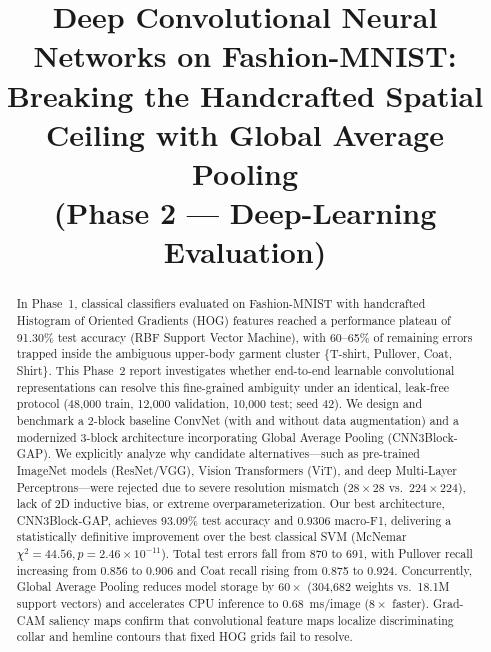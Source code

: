\documentclass[conference]{IEEEtran}
\begin{document}
\title{Deep Convolutional Neural Networks on Fashion-MNIST:\\ Breaking the Handcrafted Spatial Ceiling with Global Average Pooling\\ (Phase 2 --- Deep-Learning Evaluation)}

\author{
}

\maketitle

\begin{abstract}
In Phase~1, classical classifiers evaluated on Fashion-MNIST with handcrafted Histogram of Oriented Gradients (HOG) features reached a performance plateau of 91.30\% test accuracy (RBF Support Vector Machine), with 60--65\% of remaining errors trapped inside the ambiguous upper-body garment cluster \{T-shirt, Pullover, Coat, Shirt\}. This Phase~2 report investigates whether end-to-end learnable convolutional representations can resolve this fine-grained ambiguity under an identical, leak-free protocol (48{,}000 train, 12{,}000 validation, 10{,}000 test; seed 42). We design and benchmark a 2-block baseline ConvNet (with and without data augmentation) and a modernized 3-block architecture incorporating Global Average Pooling (CNN3Block-GAP). We explicitly analyze why candidate alternatives---such as pre-trained ImageNet models (ResNet/VGG), Vision Transformers (ViT), and deep Multi-Layer Perceptrons---were rejected due to severe resolution mismatch ($28\times28$ vs.\ $224\times224$), lack of 2D inductive bias, or extreme overparameterization. Our best architecture, CNN3Block-GAP, achieves 93.09\% test accuracy and 0.9306 macro-F1, delivering a statistically definitive improvement over the best classical SVM (McNemar $\chi^2 = 44.56, p = 2.46 \times 10^{-11}$). Total test errors fall from 870 to 691, with Pullover recall increasing from 0.856 to 0.906 and Coat recall rising from 0.875 to 0.924. Concurrently, Global Average Pooling reduces model storage by $60\times$ (304{,}682 weights vs.\ 18.1M support vectors) and accelerates CPU inference to 0.68~ms/image ($8\times$ faster). Grad-CAM saliency maps confirm that convolutional feature maps localize discriminating collar and hemline contours that fixed HOG grids fail to resolve.
\end{abstract}
\end{document}
